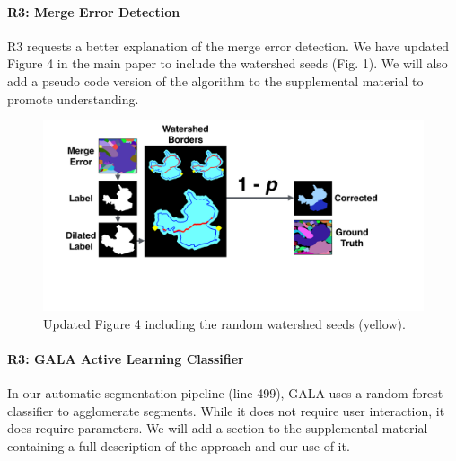 \documentclass[10pt,twocolumn,letterpaper]{article}
\begin{document}
\paragraph{R3: Merge Error Detection}
R3 requests a better explanation of the merge error detection. We have updated Figure 4 in the main paper to include the watershed seeds (Fig. 1). We will also add a pseudo code version of the algorithm to the supplemental material to promote understanding.

\begin{figure}[h]
\centering
\includegraphics[width=\linewidth]{gfx/merge_error_v5.pdf}
\caption{Updated Figure 4 including the random watershed seeds (yellow).}
\label{fig:merge_error}
\end{figure}


\paragraph{R3: GALA Active Learning Classifier}
In our automatic segmentation pipeline (line 499), GALA uses a random forest classifier to agglomerate segments. While it does not require user interaction, it does require parameters. We will add a section to the supplemental material containing a full description of the approach and our use of it. %

%
%
\end{document}
